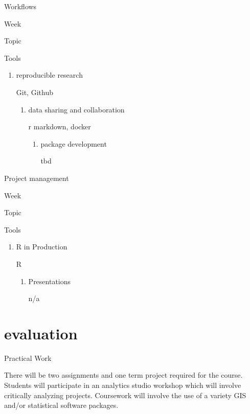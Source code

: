 \documentclass[
]{book}
\begin{document}
Workflows

Week

Topic

Tools

\begin{enumerate}
\def\labelenumi{\arabic{enumi}.}
\setcounter{enumi}{7}
\item
  reproducible research

  Git, Github

  \begin{enumerate}
  \def\labelenumii{\arabic{enumii}.}
  \setcounter{enumii}{8}
  \item
    data sharing and collaboration

    r markdown, docker

    \begin{enumerate}
    \def\labelenumiii{\arabic{enumiii}.}
    \setcounter{enumiii}{9}
    \item
      package development

      tbd
    \end{enumerate}
  \end{enumerate}
\end{enumerate}

Project management

Week

Topic

Tools

\begin{enumerate}
\def\labelenumi{\arabic{enumi}.}
\setcounter{enumi}{10}
\item
  R in Production

  R

  \begin{enumerate}
  \def\labelenumii{\arabic{enumii}.}
  \setcounter{enumii}{11}
  \item
    Presentations

    n/a
  \end{enumerate}
\end{enumerate}

\hypertarget{evaluation}{%
\section{evaluation}\label{evaluation}}

Practical Work

There will be two assignments and one term project required for the course. Students will participate in an analytics studio workshop which will involve critically analyzing projects. Coursework will involve the use of a variety GIS and/or statistical software packages.
\end{document}
